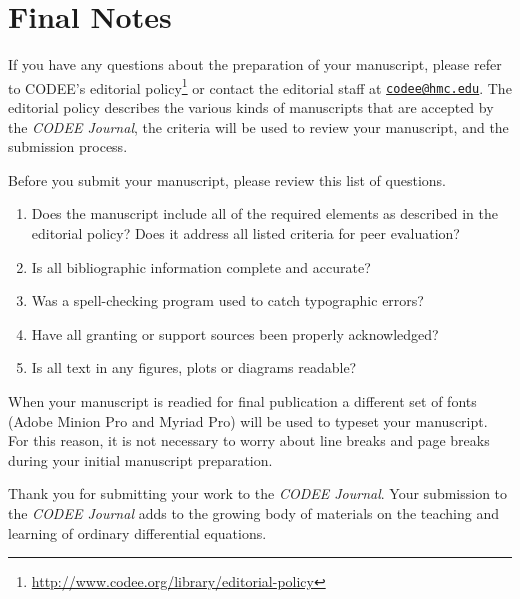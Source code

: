 \documentclass{codee}
\theoremstyle{definition}
\theoremstyle{remark}
\numberwithin{equation}{section}
\begin{document}
\section{Final Notes}

If you have any questions about the preparation of your manuscript,
please refer to CODEE's editorial
policy\footnote{\url{http://www.codee.org/library/editorial-policy}}
or contact the editorial staff at
\href{mailto:codee@hmc.edu}{\texttt{codee@hmc.edu}}. The editorial
policy describes the various kinds of manuscripts that are accepted by
the \textit{CODEE Journal}, the criteria will be used to review your
manuscript, and the submission process.

Before you submit your manuscript, please review this list of questions.
\begin{enumerate}
\item Does the manuscript include all of the required elements as
  described in the editorial policy? Does it address all listed criteria for peer evaluation?
\item Is all bibliographic information complete and accurate?
\item Was a spell-checking program used to catch typographic errors?
\item Have all granting or support sources been properly acknowledged?
\item Is all text in any figures, plots or diagrams readable?
\end{enumerate}

When your manuscript is readied for final publication a different set
of fonts (Adobe Minion Pro and Myriad Pro) will be used to typeset
your manuscript. For this reason, it is not necessary to worry about
line breaks and page breaks during your initial manuscript
preparation.

Thank you for submitting your work to the \textit{CODEE Journal}. Your
submission to the \textit{CODEE Journal} adds to the growing body of
materials on the teaching and learning of ordinary differential
equations.


{}
\nocite{*}
\end{document}
